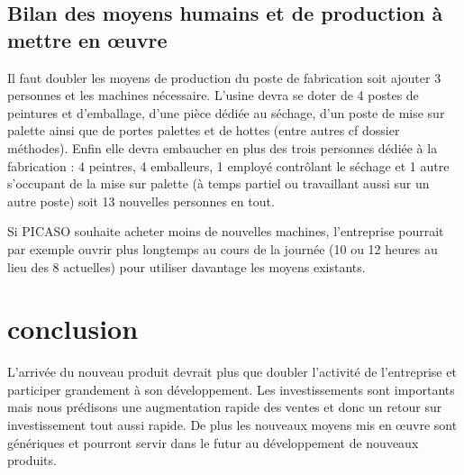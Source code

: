 \documentclass[a4paper]{TPInsa}
\begin{document}
	\subsection{Bilan des moyens humains et de production à mettre en œuvre}

	Il faut doubler les moyens de production du poste de fabrication soit ajouter 3 personnes et les machines nécessaire. 
	L'usine devra se doter de 4 postes de peintures et d'emballage, d'une pièce dédiée au séchage, d'un poste de mise sur palette ainsi que de portes palettes et de hottes (entre autres cf dossier méthodes). 
	Enfin elle devra embaucher en plus des trois personnes dédiée à la fabrication : 4 peintres, 4 emballeurs, 1 employé contrôlant le séchage et 1 autre s'occupant de la mise sur palette (à temps partiel ou travaillant aussi sur un autre poste) soit 13 nouvelles personnes en tout. 
	
	Si PICASO souhaite acheter moins de nouvelles machines, l'entreprise pourrait par exemple ouvrir plus longtemps au cours de la journée (10 ou 12 heures au lieu des 8 actuelles) pour utiliser davantage les moyens existants. 

	\section{conclusion}

L'arrivée du nouveau produit devrait plus que doubler l'activité de l'entreprise et participer grandement à son développement. Les investissements sont importants mais nous prédisons une augmentation rapide des ventes et donc un retour sur investissement tout aussi rapide. De plus les nouveaux moyens mis en œuvre sont génériques et pourront servir dans le futur au développement de nouveaux produits. 




















	
\end{document}
